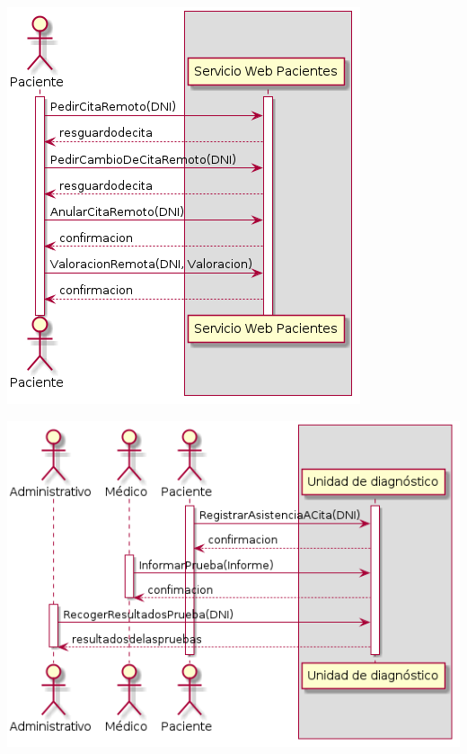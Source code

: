 \documentclass[10pt,a4paper,spanish]{report}
\begin{document}
\begin{center}
\vspace{0.5cm}

\includegraphics[scale=0.50]{ServicioWebPacientes.png}

\vspace{0.5cm}

\includegraphics[scale=0.50]{UnidadDeDiagnistico.png}

\end{center}
\end{document}

